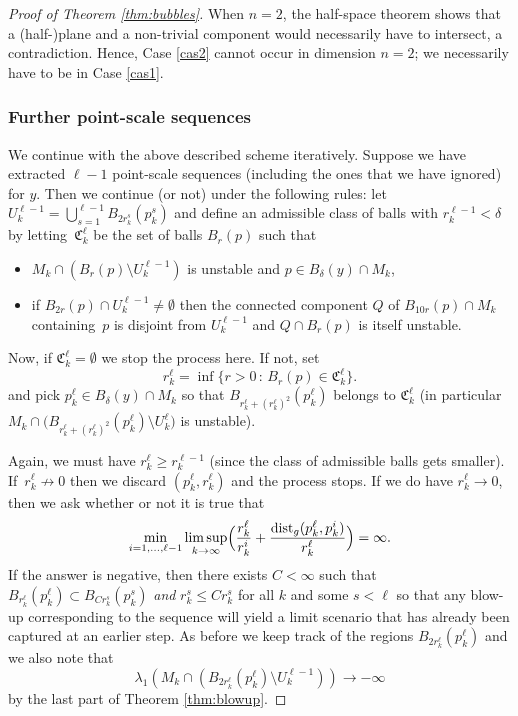 \documentclass[10pt]{amsart}
\newcounter{cas}
\newcommand{\sep}{\,:\,}
\DeclareMathOperator{\dist}{dist}
\theoremstyle{definition}
\begin{document}
\begin{proof}[Proof of Theorem \ref{thm:bubbles}]
When $n=2$, the half-space theorem shows that a (half-)plane and a non-trivial component would necessarily have to intersect, a contradiction. Hence, Case \ref{cas2} cannot occur in dimension $n=2$; we necessarily have to be in Case \ref{cas1}.
\addtocounter{cas}{-2}

\subsubsection*{Further point-scale sequences}
We continue with the above described scheme iteratively. Suppose we have extracted $\ell-1$ point-scale sequences (including the ones that we have ignored) for $y$. Then we continue (or not) under the following rules: let $U^{\ell-1}_k = \bigcup_{s=1}^{\ell-1} B_{2r^s_k }(p_k^s)$ and define an admissible class of balls with $r^{\ell -1}_k<\delta$ by letting~$\mathfrak{C}^\ell_k$ be the set of balls $B_r(p)$ such that 
\begin{itemize}
\item
$M_k\cap (B_r(p)\setminus U^{\ell -1}_k)$ is unstable and $p\in B_\delta (y)\cap M_k$,
\item
if $B_{2r}(p)\cap U^{\ell-1}_k\neq\emptyset$ then the connected component $Q$ of $B_{10r}(p)\cap M_k$ containing~$p$ is disjoint from $U^{\ell-1}_k$ and $Q\cap B_{r}(p)$ is itself unstable.
\end{itemize}
Now, if $\mathfrak{C}^\ell_k =\emptyset$ we stop the process here. If not, set
\begin{equation*}
r^\ell_k = \inf \bigl\{r>0 \sep B_r(p)\in \mathfrak{C}^{\ell}_k\bigr\}.
\end{equation*}
and pick $p^{\ell}_k\in B_\delta(y)\cap M_k$ so that $B_{r^\ell_k +(r^{\ell}_k)^2}(p^\ell_k)$ belongs to $\mathfrak{C}^\ell_k$ (in particular \hbox{$M_k \cap\big( B_{r^\ell_k +(r^{\ell}_k)^2}(p^\ell_k)\setminus U^\ell_k\big)$} is unstable).

Again, we must have $r^\ell_k\geq r^{\ell-1}_k$ (since the class of admissible balls gets smaller). If~$r^\ell_k \not\to 0$ then we discard $(p_k^\ell, r_k^\ell)$ and the process stops. If we do have $r_k^\ell \to 0$, then we ask whether or not it is true that
\begin{equation}\label{eq.psinf2}
\min_{i=1,\dots, \ell-1}\limsup_{k\to \infty} \Bigl(\frac{r^\ell_k}{r^{i}_k} + \frac{\dist_g(p_k^\ell,p_k^i)}{r^\ell_k} \Bigr) = \infty.
\end{equation}
If the answer is negative, then there exists $C<\infty$ such that $B_{r^\ell_k}(p^\ell_k)\subset B_{Cr^s_k}(p^s_k)$ \emph{and} $r^s_k\leq C r^s_k$ for all $k$ and some $s<\ell$ so that any blow-up corresponding to the sequence will yield a limit scenario that has already been captured at an earlier step. As before we keep track of the regions $B_{2r^\ell_k}(p^\ell_k)$ and we also note that
$$\lambda_1(M_k \cap (B_{2r^\ell_k}(p^\ell_k)\setminus U^{\ell-1}_k))\to -\infty$$ by the last part of Theorem \ref{thm:blowup}.


\end{proof}
\end{document}
